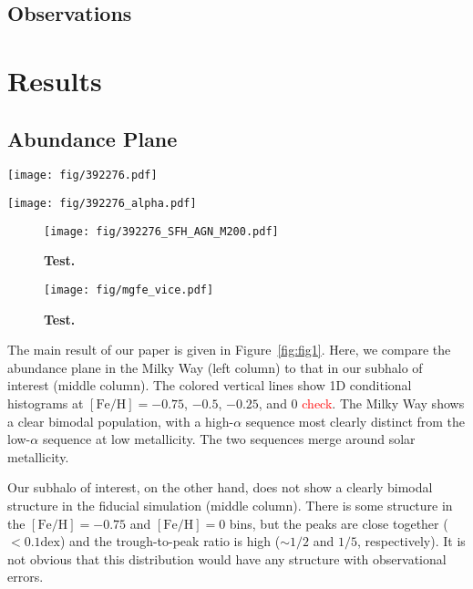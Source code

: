 \documentclass[linenumbers, twocolumn]{aastex631}
\newcommand{\FeH}{\ensuremath{[\textrm{Fe}/\textrm{H}]}}
\newcommand{\dex}{\ensuremath{\textrm{dex}}}
\newcommand{\red}[1]{\textcolor{red}{#1}}
\begin{document}
\subsection{Observations}\label{ssec:obs}

\section{Results}\label{sec:results}
\subsection{Abundance Plane}\label{ssec:plane}

\begin{figure*}
  \centering
  \texttt{[image: fig/392276.pdf]}
  \caption{\textbf{Test.}}
  \label{fig:fig1}
\end{figure*}

\begin{figure*}
  \centering
  \texttt{[image: fig/392276\_alpha.pdf]}
  \caption{\textbf{Test.}}
  \label{fig:alpha}
\end{figure*}

\begin{figure}
  \centering
  \texttt{[image: fig/392276\_SFH\_AGN\_M200.pdf]}
  \caption{\textbf{Test.}}
  \label{fig:history}
\end{figure}

\begin{figure}
  \centering
  \texttt{[image: fig/mgfe\_vice.pdf]}
  \caption{\textbf{Test.}}
  \label{fig:vice}
\end{figure}

The main result of our paper is given in Figure~\ref{fig:fig1}. Here, we compare the abundance plane in the Milky Way (left column) to that in our subhalo of interest (middle column). The colored vertical lines show 1D conditional histograms at $\FeH=-0.75$, $-0.5$, $-0.25$, and $0$ \red{check}. The Milky Way shows a clear bimodal population, with a high-$\alpha$ sequence most clearly distinct from the low-$\alpha$ sequence at low metallicity. The two sequences merge around solar metallicity.

Our subhalo of interest, on the other hand, does not show a clearly bimodal structure in the fiducial simulation (middle column). There is some structure in the $\FeH=-0.75$ and $\FeH=0$ bins, but the peaks are close together ($<0.1\dex$) and the trough-to-peak ratio is high ($\sim1/2$ and $1/5$, respectively). It is not obvious that this distribution would have any structure with observational errors.
\end{document}
